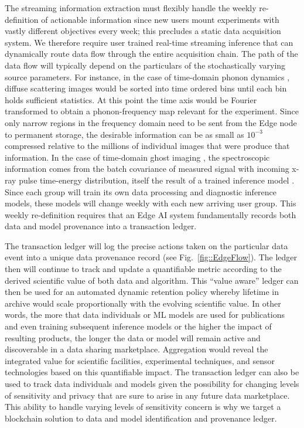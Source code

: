 \documentclass{article}
\begin{document}
The streaming information extraction must flexibly handle the weekly re-definition of actionable information since new users mount experiments with vastly different objectives every week; this precludes a static data acquisition system. 
We therefore require user trained real-time streaming inference that can dynamically route data flow through the entire acquisition chain.
The path of the data flow will typically depend on the particulars of the stochastically varying source parameters.
For instance, in the case of time-domain phonon dynamics \cite{Mariano2013}, diffuse scattering images would be sorted into time ordered bins until each bin holds sufficient statistics.
At this point the time axis would be Fourier transformed to obtain a phonon-frequency map relevant for the experiment.
Since only narrow regions in the frequency domain need to be sent from the Edge node to permanent storage, the desirable information can be as small as $10^{-3}$ compressed relative to the millions of individual images that were produce that information.
In the case of time-domain ghost imaging \cite{Taran2020}, the spectroscopic information comes from the batch covariance of measured signal with incoming x-ray pulse time-energy distribution, itself the result of a trained inference model \cite{Audrey}.
Since each group will train its own data processing and diagnostic inference models, these models will change weekly with each new arriving user group.
This weekly re-definition requires that an Edge AI system fundamentally records both data and model provenance into a transaction ledger.

The transaction ledger will log the precise actions taken on the particular data event into a unique data provenance record (see Fig.~\ref{fig::EdgeFlow}).
The ledger then will continue to track and update a quantifiable metric according to the derived scientific value of both data and algorithm.
This ``value aware'' ledger can then be used for an automated dynamic retention policy whereby lifetime in archive would scale proportionally with the evolving scientific value.
In other words, the more that data individuals or ML models are used for publications and even training subsequent inference models or the higher the impact of resulting products, the longer the data or model will remain active and discoverable in a data sharing marketplace. 
Aggregation would reveal the integrated value for scientific facilities, experimental techniques, and sensor technologies based on this quantifiable impact.
The transaction ledger can also be used to track data individuals and models given the possibility for changing levels of sensitivity and privacy that are sure to arise in any future data marketplace. 
This ability to handle varying levels of sensitivity concern is why we target a blockchain solution to data and model identification and provenance ledger.
\end{document}
